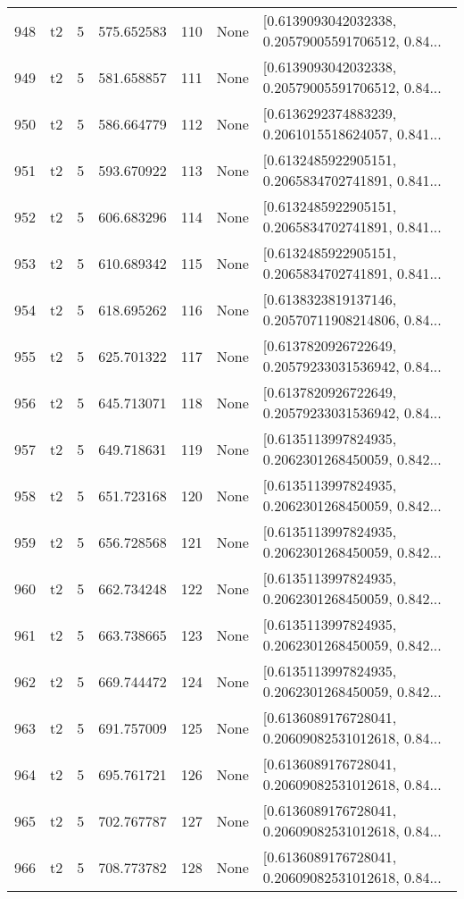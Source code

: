 \begin{tabular}{lllrlll}
948 &  t2 &   5 &   575.652583 &  110 &  None &  [0.6139093042032338, 0.20579005591706512, 0.84... \\
949 &  t2 &   5 &   581.658857 &  111 &  None &  [0.6139093042032338, 0.20579005591706512, 0.84... \\
950 &  t2 &   5 &   586.664779 &  112 &  None &  [0.6136292374883239, 0.2061015518624057, 0.841... \\
951 &  t2 &   5 &   593.670922 &  113 &  None &  [0.6132485922905151, 0.2065834702741891, 0.841... \\
952 &  t2 &   5 &   606.683296 &  114 &  None &  [0.6132485922905151, 0.2065834702741891, 0.841... \\
953 &  t2 &   5 &   610.689342 &  115 &  None &  [0.6132485922905151, 0.2065834702741891, 0.841... \\
954 &  t2 &   5 &   618.695262 &  116 &  None &  [0.6138323819137146, 0.20570711908214806, 0.84... \\
955 &  t2 &   5 &   625.701322 &  117 &  None &  [0.6137820926722649, 0.20579233031536942, 0.84... \\
956 &  t2 &   5 &   645.713071 &  118 &  None &  [0.6137820926722649, 0.20579233031536942, 0.84... \\
957 &  t2 &   5 &   649.718631 &  119 &  None &  [0.6135113997824935, 0.2062301268450059, 0.842... \\
958 &  t2 &   5 &   651.723168 &  120 &  None &  [0.6135113997824935, 0.2062301268450059, 0.842... \\
959 &  t2 &   5 &   656.728568 &  121 &  None &  [0.6135113997824935, 0.2062301268450059, 0.842... \\
960 &  t2 &   5 &   662.734248 &  122 &  None &  [0.6135113997824935, 0.2062301268450059, 0.842... \\
961 &  t2 &   5 &   663.738665 &  123 &  None &  [0.6135113997824935, 0.2062301268450059, 0.842... \\
962 &  t2 &   5 &   669.744472 &  124 &  None &  [0.6135113997824935, 0.2062301268450059, 0.842... \\
963 &  t2 &   5 &   691.757009 &  125 &  None &  [0.6136089176728041, 0.20609082531012618, 0.84... \\
964 &  t2 &   5 &   695.761721 &  126 &  None &  [0.6136089176728041, 0.20609082531012618, 0.84... \\
965 &  t2 &   5 &   702.767787 &  127 &  None &  [0.6136089176728041, 0.20609082531012618, 0.84... \\
966 &  t2 &   5 &   708.773782 &  128 &  None &  [0.6136089176728041, 0.20609082531012618, 0.84... \\

\end{tabular}
